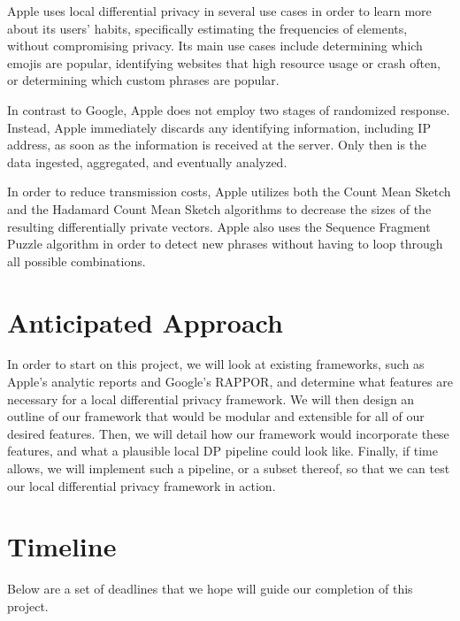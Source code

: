 \documentclass[12pt]{article}
\begin{document}
\noindent

Apple uses local differential privacy in several use cases in order to learn more about its users' habits, specifically estimating the frequencies of elements, without compromising privacy. Its main use cases include determining which emojis are popular, identifying websites that high resource usage or crash often, or determining which custom phrases are popular.

\medskip

In contrast to Google, Apple does not employ two stages of randomized response. Instead, Apple immediately discards any identifying information, including IP address, as soon as the information is received at the server. Only then is the data ingested, aggregated, and eventually analyzed.

\medskip

In order to reduce transmission costs, Apple utilizes both the Count Mean Sketch and the Hadamard Count Mean Sketch algorithms to decrease the sizes of the resulting differentially private vectors. Apple also uses the Sequence Fragment Puzzle algorithm in order to detect new phrases without having to loop through all possible combinations.

\section*{Anticipated Approach}

\noindent

In order to start on this project, we will look at existing frameworks, such as Apple's analytic reports and Google's RAPPOR, and determine what features are necessary for a local differential privacy framework. We will then design an outline of our framework that would be modular and extensible for all of our desired features. Then, we will detail how our framework would incorporate these features, and what a plausible local DP pipeline could look like. Finally, if time allows, we will implement such a pipeline, or a subset thereof, so that we can test our local differential privacy framework in action.

\section*{Timeline}

\noindent

Below are a set of deadlines that we hope will guide our completion of this project.
\end{document}
